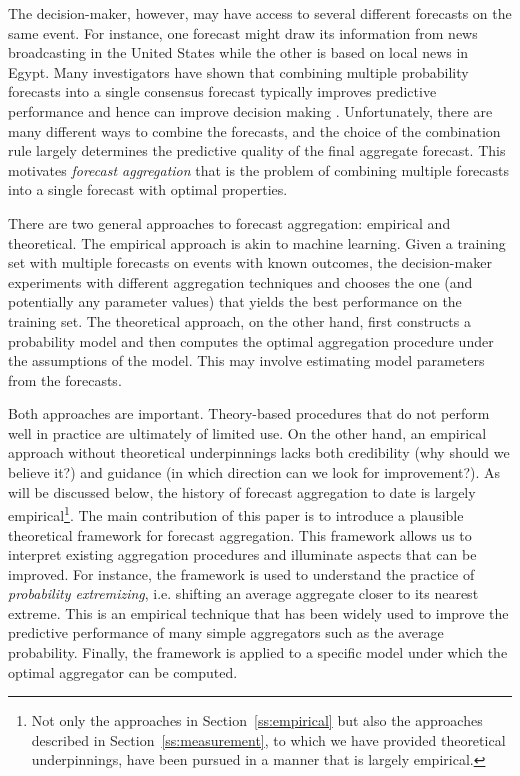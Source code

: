 \documentclass[11pt]{article}
\theoremstyle{definition}
\theoremstyle{definition}
\begin{document}
The decision-maker, however, may have access to several different forecasts on the same event. For instance, one forecast might draw its information from news broadcasting in the United States while the other
is based on local news in Egypt. Many investigators have shown that combining multiple probability forecasts into a single consensus forecast typically improves predictive performance and hence can improve decision making \citep{clemen1989combining,
armstrong2001combining}. Unfortunately, there are many different ways to combine the forecasts, and the choice of the combination
rule largely determines the predictive quality of the final
aggregate forecast.  
This motivates \textit{forecast aggregation} that
is the problem of combining multiple forecasts into a single
forecast with optimal properties.

There are two general approaches to forecast aggregation: empirical
and theoretical.  The empirical approach is akin to machine
learning. Given a training set with multiple forecasts on events with
known outcomes, the decision-maker experiments with different
aggregation techniques and chooses the one (and potentially any
parameter values) that yields the best performance on the training set.
The theoretical approach, on the other hand, first constructs a
probability model and then computes the optimal aggregation procedure
under the assumptions of the model.  This may involve estimating model
parameters from the forecasts.

Both approaches are important.  Theory-based procedures that do not
perform well in practice are ultimately of limited use.  On the other
hand, an empirical approach without theoretical underpinnings lacks
both credibility (why should we believe it?)  and guidance (in which
direction can we look for improvement?).  As will be discussed below,
the history of forecast aggregation to date is largely
empirical\footnote{Not only the approaches in
Section~\ref{ss:empirical} but also the approaches described in
Section~\ref{ss:measurement}, to which we have provided theoretical
underpinnings, have been pursued in a manner that is largely
empirical.}.  The main contribution of this paper is to introduce a plausible
theoretical framework for forecast aggregation.  This framework allows
us to interpret existing aggregation procedures and illuminate aspects
that can be improved. For instance, the
framework is used to understand the practice of {\em probability
extremizing}, i.e. shifting an average aggregate closer to its nearest
extreme. This is an empirical technique that has been widely used to
improve the predictive performance of many simple aggregators such as
the average probability. Finally, the framework is applied to a
specific model under which the optimal aggregator can be computed.
\end{document}

